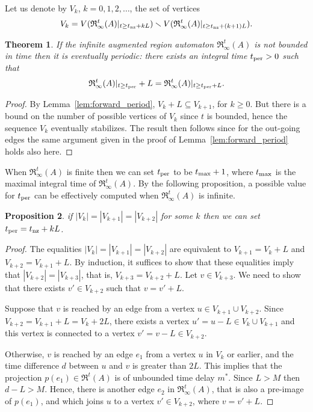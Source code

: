 \documentclass[11pt]{amsart}
\newtheorem{theorem}{Theorem}[section]
\newtheorem{proposition}[theorem]{Proposition}
\theoremstyle{definition}
\newcommand{\ARRR}{\mathfrak{R}^t}
\newcommand{\IARRR}{\mathfrak{R}_{\infty}^{t}}
\begin{document}
Let us denote by $V_k$, $k = 0,1,2, \ldots$, the set of vertices
$$V_k = V(\IARRR(A)|_{t \geq t_\textnormal{nz}+kL}) \smallsetminus V(\IARRR(A)|_{t \geq t_\textnormal{nz}+(k+1)L}).$$
\begin{theorem}
\label{th:eventual_period}
If the infinite augmented region automaton $\IARRR(A)$ is not bounded in time then it is eventually periodic: there exists an integral time $t_\textnormal{per} > 0$ such that 
$$\IARRR(A)|_{t \geq t_\textnormal{per}} + L = \IARRR(A)|_{t \geq t_\textnormal{per}+L}.$$
\end{theorem}
\begin{proof}
By Lemma~\ref{lem:forward_period}, $V_k + L \subseteq V_{k+1}$, for $k \geq 0$.
But there is a bound on the number of possible vertices of $V_k$ since $t$ is bounded, hence the sequence $V_k$ eventually stabilizes.
The result then follows since for the out-going edges the same argument given in the proof of Lemma~\ref{lem:forward_period} holds also here.
\end{proof}
When $\IARRR(A)$ is finite then we can set $t_\textnormal{per}$ to be $t_\textnormal{max} + 1$, where $t_\textnormal{max}$ is the maximal integral time of $\IARRR(A)$.
By the following proposition, a possible value for $t_\textnormal{per}$ can be effectively computed when $\IARRR(A)$ is infinite.
\begin{proposition}
\label{prop:cons_eq}
if $|V_k| = |V_{k+1}| = |V_{k+2}|$ for some $k$ then we can set
$t_\textnormal{per} = t_\textnormal{nz}+kL$.
\end{proposition}
\begin{proof}
The equalities $|V_k| = |V_{k+1}| = |V_{k+2}|$ are equivalent to $V_{k+1} = V_k +L$ and $V_{k+2} = V_{k+1} +L$. 
By induction, it suffices to show that these equalities imply that $|V_{k+2}| = |V_{k+3}|$, that is, $V_{k+3} = V_{k+2} +L$.
Let $v \in V_{k+3}$.
We need to show that there exists $v' \in V_{k+2}$ such that $v=v'+L$.

Suppose that $v$ is reached by an edge from a vertex $u \in V_{k+1} \cup V_{k+2}$.
Since $V_{k+2} = V_{k+1} +L = V_k + 2L$, there exists a vertex $u'=u-L \in V_{k} \cup V_{k+1}$ and this vertex is connected to a vertex  $v' = v-L \in V_{k+2}$.

Otherwise, $v$ is reached by an edge $e_1$ from a vertex $u$ in $V_k$ or earlier, and the time difference $d$ between $u$ and $v$ is greater than $2L$.
This implies that the projection $p(e_1) \in \ARRR(A)$ is of unbounded time delay $m^*$.
Since $L>M$ then $d-L>M$.
Hence, there is another edge $e_2$ in $\IARRR(A)$, that is also a pre-image of $p(e_1)$, and which joins $u$ to a vertex $v' \in V_{k+2}$, where $v=v'+L$.
\end{proof}
\end{document}
